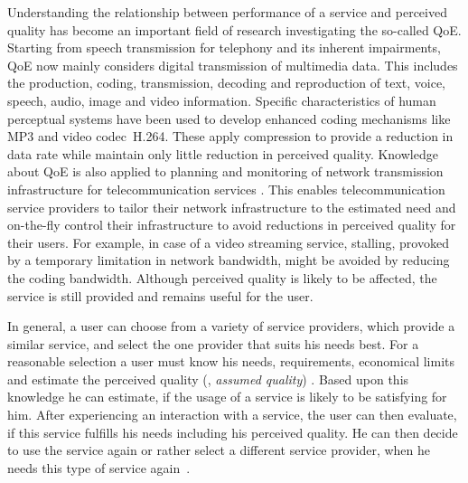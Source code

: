 Understanding the relationship between performance of a service and perceived quality has become an important field of research investigating the so-called \ac{QoE}.
Starting from speech transmission for telephony \citep[][]{ieee_audio_and_electroacoustics_group_ieee_1969} and its inherent impairments, \ac{QoE} now mainly considers digital transmission of multimedia data. %
This includes the production, coding, transmission, decoding and reproduction of text, voice, speech, audio, image and video information.
Specific characteristics of human perceptual systems have been used to develop enhanced coding mechanisms like \ac{MP3} and video codec~H.264.
These apply compression to provide a reduction in data rate while maintain only little reduction in perceived quality.
Knowledge about \ac{QoE} is also applied to planning and monitoring of network transmission infrastructure for telecommunication services \citep[][]{schatz_qoe-based_2014}.
This enables telecommunication service providers to tailor their network infrastructure to the estimated need and on-the-fly control their infrastructure to avoid reductions in perceived quality for their users.
For example, in case of a video streaming service, stalling, provoked by a temporary limitation in network bandwidth, might be avoided by reducing the coding bandwidth.
Although perceived quality is likely to be affected, the service is still provided and remains useful for the user.

In general, a user can choose from a variety of service providers, which provide a similar service, and select the one provider that suits his needs best.
For a reasonable selection a user must know his needs, requirements, economical limits and estimate the perceived quality (\ie, \emph{assumed quality}) \citep[][p.~13]{raake_quality_2014}.
Based upon this knowledge he can estimate, if the usage of a service is likely to be satisfying for him.
After experiencing an interaction with a service, the user can then evaluate, if this service fulfills his needs including his perceived quality.
He can then decide to use the service again or rather select a different service provider, when he needs this type of service again~\citep[][]{geerts_linking_2010}.

